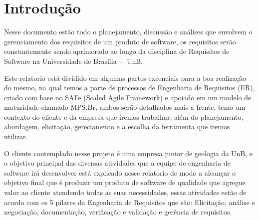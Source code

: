 \chapter{Introdução}

  Nesse documento estão todo o planejamento, discussão e análises que envolvem o gerenciamento dos requisitos de um produto de
  software, os requisitos serão constantemente sendo aprimorado ao longo da disciplina de Requisitos de Software na Universidade
  de Brasília $-$ UnB.

  Este relatorio está dividido em algumas partes excenciais para a boa realização do mesmo, na qual temos a parte de processos de
  Engenharia de Requisitos (ER), criado com base no SAFe (Scaled Agile Framework) e apoiado em um modelo de maturidade chamado MPS.Br,
  ambos serão detalhados mais a frente, temo um contexto do cliente e da empresa que iremos trabalhar, além do planejamento, abordagem,
  elicitação, gereciamento e a escolha da ferramenta que iremos utilizar.

  O cliente contemplado nesse projeto é uma empresa junior de geologia da UnB, e o objetivo principal das diversas atividades que a
  equipe de engenharia de software irá desenvolver está explicado nesse relatorio de modo a alcançar o objetivo final que é produzir
  um produto de software de qualidade que agregue valor ao cliente atendendo todas as suas necessidades, essas atividades estão de
  acordo com os 5 pilares da Engenharia de Requisitos que são: Elicitação, análise e negociação, documentaçào, verificação e validação
  e gerência de requisitos.



